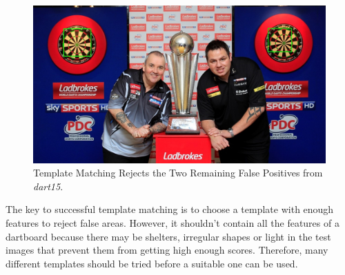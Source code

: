 \documentclass[conference]{IEEEtran}
\begin{document}
\par 
\begin{figure}[!htb]
\begin{center}
\includegraphics[width=1\linewidth]{images/template_merit.jpg}
\caption{Template Matching Rejects the Two Remaining False Positives from \emph{dart15}.}
\label{default}
\end{center}
\end{figure}
The key to successful template matching is to choose a template with enough features to reject false areas. However, it shouldn't contain all the features of a dartboard because there may be shelters, irregular shapes or light in the test images that prevent them from getting high enough scores. Therefore, many different templates should be tried before a suitable one can be used.
\newpage
\end{document}
